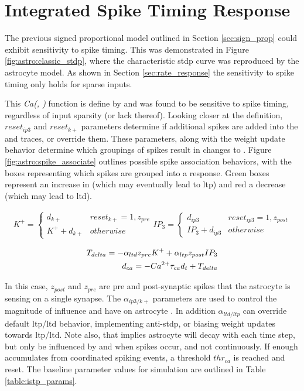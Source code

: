\section{Integrated Spike Timing Response} \label{section:istp}
The previous signed proportional model outlined in Section
\ref{sec:sign_prop} could exhibit sensitivity to spike timing. This was
demonstrated in Figure \ref{fig:astro:classic_stdp}, where the characteristic
\gls{stdp} curve was reproduced by the astrocyte model. As shown in Section
\ref{sec:rate_response} the sensitivity to spike timing only holds for sparse
inputs.

This \emph{Ca(\ipt, \kp\!)} function is define by  and was
found to be sensitive to spike timing, regardless of input sparsity (or lack
thereof). Looking closer at the definition, $reset_{ip3}$ and $reset_{k+}$
parameters determine if additional spikes are added into the \ipt and \kp
traces, or override them. These parameters, along with the weight update
behavior determine which groupings of spikes result in changes to \ca. Figure
\ref{fig:astro:spike_associate} outlines possible spike association behaviors,
with the boxes representing which spikes are grouped into a \ca response. Green
boxes represent an increase in \ca (which may eventually lead to \gls{ltp}) and
red a decrease (which may lead to \gls{ltd}).

\begin{align}
  K^+ =
  \begin{cases} 
    d_{k+} & reset_{k+} = 1, z_{pre}
    \\ K^+ + d_{k+} & otherwise
  \end{cases}
  IP_3 =
  \begin{cases} 
    d_{ip3} & reset_{ip3} = 1, z_{post}
    \\ IP_3 + d_{ip3} & otherwise
  \end{cases}
\end{align}


\begin{align}
T_{delta} = -\alpha_{ltd} z_{pre} K^+ + \alpha_{ltp} z_{post} IP_3\\
d_{ca} = -Ca^{2+} \tau_{ca} d_t + T_{delta} \label{eq:astro:temp-u}
\end{align}

In this case, $z_{post}$ and $z_{pre}$ are pre and post-synaptic spikes that
the astrocyte is sensing on a single synapse. The $\alpha_{ip3/k+}$ parameters
are used to control the magnitude of influence \ipt and \kp have on astrocyte
\ca. In addition $\alpha_{ltd/ltp}$ can override default \gls{ltp}/\gls{ltd} behavior,
implementing anti-stdp, or biasing weight updates towards \gls{ltp}/\gls{ltd}. Note also,
that  implies astrocyte \ca will decay with each
time step, but only be influenced by \ipt and \kp when spikes occur, and
not continuously. If enough \ca accumulates from coordinated spiking events, a
threshold $thr_{ca}$ is reached and \ca reset. The baseline parameter values
for simulation are outlined in Table \ref{table:istp_params}.

